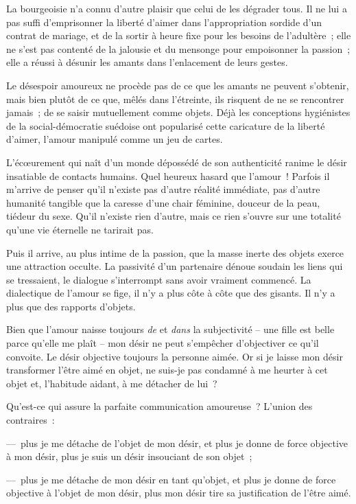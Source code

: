 \documentclass[french,twoside]{book} %
\begin{document}
\noindent La bourgeoisie n’a connu d’autre plaisir que celui de les dégrader tous. Il ne lui a pas suffi d’emprisonner la liberté d’aimer dans l’appropriation sordide d’un contrat de mariage, et de la sortir à heure fixe pour les besoins de l’adultère ; elle ne s’est pas contenté de la jalousie et du mensonge pour empoisonner la passion ; elle a réussi à désunir les amants dans l’enlacement de leurs gestes.\par
Le désespoir amoureux ne procède pas de ce que les amants ne peuvent s’obtenir, mais bien plutôt de ce que, mêlés dans l’étreinte, ils risquent de ne se rencontrer jamais ; de se saisir mutuellement comme objets. Déjà les conceptions hygiénistes de la social-démocratie suédoise ont popularisé cette caricature de la liberté d’aimer, l’amour manipulé comme un jeu de cartes.\par
L’écœurement qui naît d’un monde dépossédé de son authenticité ranime le désir insatiable de contacts humains. Quel heureux hasard que l’amour ! Parfois il m’arrive de penser qu’il n’existe pas d’autre réalité immédiate, pas d’autre humanité tangible que la caresse d’une chair féminine, douceur de la peau, tiédeur du sexe. Qu’il n’existe rien d’autre, mais ce rien s’ouvre sur une totalité qu’une vie éternelle ne tarirait pas.\par
Puis il arrive, au plus intime de la passion, que la masse inerte des objets exerce une attraction occulte. La passivité d’un partenaire dénoue soudain les liens qui se tressaient, le dialogue s’interrompt sans avoir vraiment commencé. La dialectique de l’amour se fige, il n’y a plus côte à côte que des gisants. Il n’y a plus que des rapports d’objets.\par
Bien que l’amour naisse toujours \emph{de} et \emph{dans} la subjectivité – une fille est belle parce qu’elle me plaît – mon désir ne peut s’empêcher d’objectiver ce qu’il convoite. Le désir objective toujours la personne aimée. Or si je laisse mon désir transformer l’être aimé en objet, ne suis-je pas condamné à me heurter à cet objet et, l’habitude aidant, à me détacher de lui ?\par
Qu’est-ce qui assure la parfaite communication amoureuse ? L’union des contraires :\par
— plus je me détache de l’objet de mon désir, et plus je donne de force objective à mon désir, plus je suis un désir insouciant de son objet ;\par
— plus je me détache de mon désir en tant qu’objet, et plus je donne de force objective à l’objet de mon désir, plus mon désir tire sa justification de l’être aimé.\par
\end{document}
